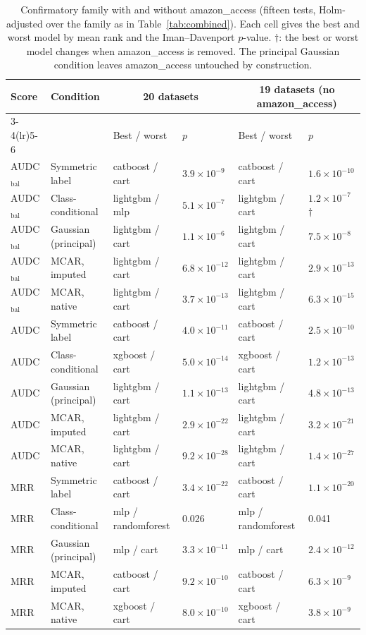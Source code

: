 \documentclass[pdflatex,sn-mathphys]{sn-jnl}
\theoremstyle{thmstyleone}
\theoremstyle{thmstyletwo}
\theoremstyle{thmstylethree}
\begin{document}
\begin{table}[t]
\centering
\footnotesize
\caption{Confirmatory family with and without amazon\_access (fifteen tests, Holm-adjusted over the family as in Table~\ref{tab:combined}). Each cell gives the best and worst model by mean rank and the Iman--Davenport $p$-value. $\dagger$: the best or worst model changes when amazon\_access is removed. The principal Gaussian condition leaves amazon\_access untouched by construction.}
\label{tab:amazon}
\begin{tabular}{@{}llllll@{}}
\toprule
Score & Condition & \multicolumn{2}{c}{20 datasets} & \multicolumn{2}{c}{19 datasets (no amazon\_access)} \\
\cmidrule(lr){3-4}\cmidrule(lr){5-6}
 & & Best / worst & $p$ & Best / worst & $p$ \\
\midrule
AUDC$_{\mathrm{bal}}$ & Symmetric label & catboost / cart & $3.9\times10^{-9}$ & catboost / cart & $1.6\times10^{-10}$ \\
AUDC$_{\mathrm{bal}}$ & Class-conditional & lightgbm / mlp & $5.1\times10^{-7}$ & lightgbm / cart & $1.2\times10^{-7}$ $\dagger$ \\
AUDC$_{\mathrm{bal}}$ & Gaussian (principal) & lightgbm / cart & $1.1\times10^{-6}$ & lightgbm / cart & $7.5\times10^{-8}$ \\
AUDC$_{\mathrm{bal}}$ & MCAR, imputed & lightgbm / cart & $6.8\times10^{-12}$ & lightgbm / cart & $2.9\times10^{-13}$ \\
AUDC$_{\mathrm{bal}}$ & MCAR, native & lightgbm / cart & $3.7\times10^{-13}$ & lightgbm / cart & $6.3\times10^{-15}$ \\
AUDC & Symmetric label & catboost / cart & $4.0\times10^{-11}$ & catboost / cart & $2.5\times10^{-10}$ \\
AUDC & Class-conditional & xgboost / cart & $5.0\times10^{-14}$ & xgboost / cart & $1.2\times10^{-13}$ \\
AUDC & Gaussian (principal) & lightgbm / cart & $1.1\times10^{-13}$ & lightgbm / cart & $4.8\times10^{-13}$ \\
AUDC & MCAR, imputed & lightgbm / cart & $2.9\times10^{-22}$ & lightgbm / cart & $3.2\times10^{-21}$ \\
AUDC & MCAR, native & lightgbm / cart & $9.2\times10^{-28}$ & lightgbm / cart & $1.4\times10^{-27}$ \\
MRR & Symmetric label & catboost / cart & $3.4\times10^{-22}$ & catboost / cart & $1.1\times10^{-20}$ \\
MRR & Class-conditional & mlp / randomforest & 0.026 & mlp / randomforest & 0.041 \\
MRR & Gaussian (principal) & mlp / cart & $3.3\times10^{-11}$ & mlp / cart & $2.4\times10^{-12}$ \\
MRR & MCAR, imputed & catboost / cart & $9.2\times10^{-10}$ & catboost / cart & $6.3\times10^{-9}$ \\
MRR & MCAR, native & xgboost / cart & $8.0\times10^{-10}$ & xgboost / cart & $3.8\times10^{-9}$ \\
\bottomrule
\end{tabular}
\end{table}
\end{document}
